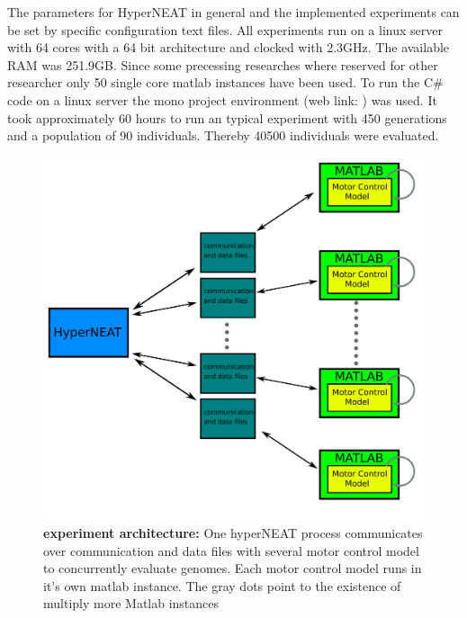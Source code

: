 The parameters for HyperNEAT in general and the implemented experiments can be set by specific configuration text files.
All experiments run on a linux server with 64 cores with a 64 bit architecture and clocked with 2.3GHz. The available RAM was 251.9GB.
Since some precessing researches where reserved for other researcher only 50 single core matlab instances have been used. 
To run the C\# code on a linux server the mono project environment (web link:  \cite{monoLink}) was used.
It took approximately 60 hours to run an typical experiment with 450 generations and a population of 90 individuals. Thereby 40500 individuals were evaluated.

\begin{figure}[tb]
	\centering
	\includegraphics[width=0.7\linewidth]{figures/System/systemarchitecure}
	\caption[experiment architecute]{\textbf{experiment architecture:} One hyperNEAT process communicates over communication and data files with several motor control model to concurrently evaluate genomes. Each motor control model runs in it's own matlab instance. The gray dots point to the existence of multiply more Matlab instances }
	\label{fig:systemarchitecure}
\end{figure}





